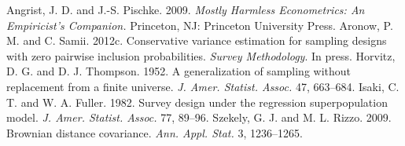 \documentclass[12pt]{article}
\newcommand{\0}{\mathbf{0}}
\begin{document}
\begin{thebibliography}{}
 Angrist, J. D. and J.-S. Pischke. 2009.  {\it Mostly Harmless Econometrics: An Empiricist's Companion.}  Princeton, NJ: Princeton University Press.
 Aronow, P. M. and C. Samii. 2012c. Conservative variance estimation for sampling designs with zero pairwise inclusion probabilities. {\it Survey Methodology}. In press.
 Horvitz, D. G. and D. J. Thompson. 1952. A generalization of sampling without replacement from a finite universe. {\it J. Amer. Statist. Assoc.} 47, 663--684.
 Isaki, C. T. and W. A. Fuller. 1982. Survey design under the regression superpopulation model. {\it J. Amer. Statist. Assoc.}  77, 89--96.
  Szekely, G. J. and M. L. Rizzo. 2009. Brownian distance covariance. {\it Ann. Appl. Stat.} 3, 1236--1265.
\end{thebibliography}
\end{document}
